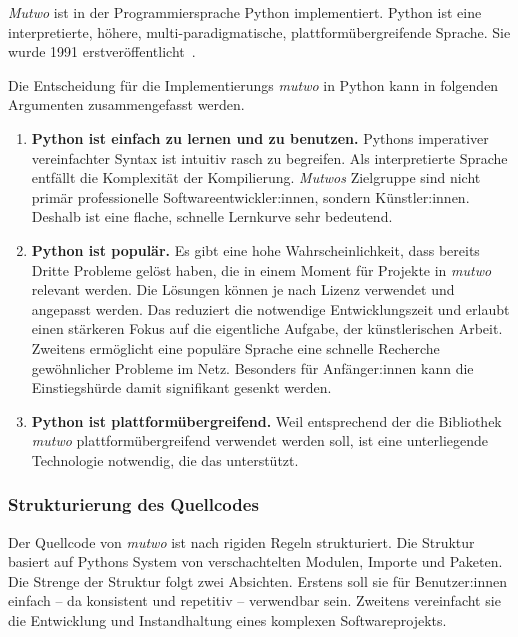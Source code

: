 \documentclass[12pt,a4paper,ngerman]{article}
\begin{document}
\emph{Mutwo} ist in der Programmiersprache Python implementiert.
Python ist eine interpretierte, höhere, multi-paradigmatische, plattformübergreifende Sprache.
Sie wurde 1991 erstveröffentlicht~\parencite{generalPythonFAQ}.

\smallskip

Die Entscheidung für die Implementierungs \emph{mutwo} in Python kann in folgenden Argumenten zusammengefasst werden.


\begin{enumerate}
    \item{
            \textbf{Python ist einfach zu lernen und zu benutzen.}
            Pythons imperativer vereinfachter Syntax ist intuitiv rasch zu begreifen.
            Als interpretierte Sprache entfällt die Komplexität der Kompilierung.
            \emph{Mutwos} Zielgruppe sind nicht primär  professionelle Softwareentwickler:innen, sondern Künstler:innen.
            Deshalb ist eine flache, schnelle Lernkurve sehr bedeutend.
    }
    \item{
            \textbf{Python ist populär.}
            Es gibt eine hohe Wahrscheinlichkeit, dass bereits Dritte Probleme gelöst haben, die in einem Moment für Projekte in \emph{mutwo} relevant werden.
            Die Lösungen können je nach Lizenz verwendet und angepasst werden.
            Das reduziert die notwendige Entwicklungszeit und erlaubt einen stärkeren Fokus auf die eigentliche Aufgabe, der künstlerischen Arbeit.
            Zweitens ermöglicht eine populäre Sprache eine schnelle Recherche gewöhnlicher Probleme im Netz.
            Besonders für Anfänger:innen kann die Einstiegshürde damit signifikant gesenkt werden.
    }
    \item{
            \textbf{Python ist plattformübergreifend.}
            Weil entsprechend der \emph{} die Bibliothek \emph{mutwo} plattformübergreifend verwendet werden soll, ist eine unterliegende Technologie notwendig, die das unterstützt.
    }
\end{enumerate}


\subsubsection{Strukturierung des Quellcodes}
\label{quellcodeStruktur}

Der Quellcode von \emph{mutwo} ist nach rigiden Regeln strukturiert.
Die Struktur basiert auf Pythons System von verschachtelten Modulen, Importe und Paketen.
Die Strenge der Struktur folgt zwei Absichten.
Erstens soll sie für Benutzer:innen einfach -- da konsistent und repetitiv -- verwendbar sein.
Zweitens vereinfacht sie die Entwicklung und Instandhaltung eines komplexen Softwareprojekts.
\end{document}
